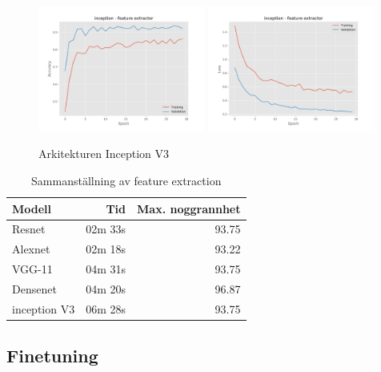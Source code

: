 \documentclass{kththesis}
\begin{document}
    \begin{figure}
      \centering
      \includegraphics[width=0.49\textwidth]{"./room/room-classification - acc - inception - feature extractor"}
      \includegraphics[width=0.49\textwidth]{"./room/room-classification - loss - inception - feature extractor"}
      \caption{Arkitekturen Inception V3}
    \end{figure}
    \begin{table}
      \centering
      \begin{tabular}{|l|r|r|}
        Modell & Tid & Max. noggrannhet \\ 
        \hline
        Resnet       & 02m 33s & 93.75 \\
        Alexnet      & 02m 18s & 93.22 \\
        VGG-11       & 04m 31s & 93.75 \\
        Densenet     & 04m 20s & 96.87 \\
        inception V3 & 06m 28s & 93.75 \\
      \end{tabular}
      \caption{Sammanställning av feature extraction}
    \end{table}

    \subsection{Finetuning}
\end{document}
